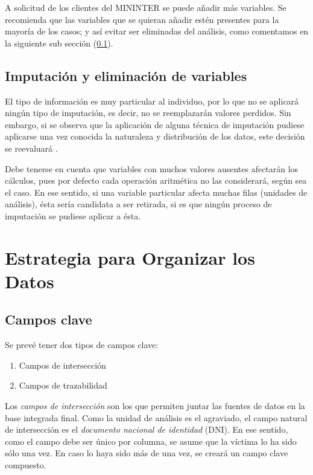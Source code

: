 \documentclass{article}
\begin{document}
A solicitud de los clientes del MININTER se puede añadir más variables. Se recomienda que las variables que se quieran añadir estén presentes para la mayoría de los casos; y así evitar ser eliminadas del análisis, como comentamos en la siguiente sub sección (\ref{imputa}).

\subsection{Imputación y eliminación de variables}\label{imputa}

El tipo de información es muy particular al individuo, por lo que no se aplicará ningún tipo de imputación, es decir, no se reemplazarán valores perdidos\cite{magallanes_reyes_cleaning_2017}. Sin embargo, si se observa que la aplicación de alguna técnica de imputación pudiese aplicarse una vez conocida la naturaleza y distribución de los datos, este decisión se reevaluará \cite{gelman_missing_2007}.

Debe tenerse en cuenta que variables con muchos valores ausentes afectarán los cálculos, pues por defecto cada operación aritmética no las considerará, según sea el caso. En ese sentido, si una variable particular afecta muchas filas (unidades de análisis), ésta sería candidata a ser retirada, si es que ningún proceso de imputación se pudiese aplicar a ésta.


\section{Estrategia para Organizar los Datos}
\subsection{Campos clave}
Se prevé tener dos tipos de campos clave:
\begin{enumerate}
\item Campos de intersección 
\item Campos de trazabilidad
\end{enumerate}

Los \emph{campos de intersección} son los que permiten juntar las fuentes de datos en la base integrada final. Como la unidad de análisis es el agraviado, el campo natural de intersección es el \emph{documento nacional de identidad} (DNI). En ese sentido, como el campo debe ser único por columna, se asume que la víctima lo ha sido sólo una vez. En caso lo haya sido más de una vez, se creará un campo clave compuesto.
\end{document}
